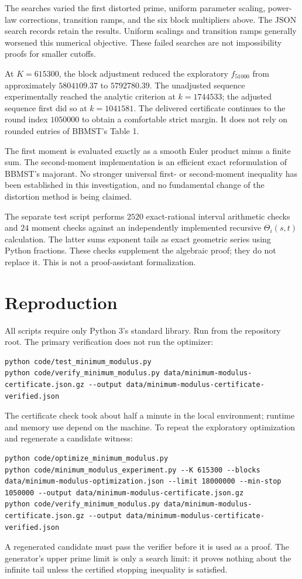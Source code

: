 \documentclass[11pt]{article}
\begin{document}
The searches varied the first distorted prime, uniform parameter scaling,
power-law corrections, transition ramps, and the six block multipliers above.
The JSON search records retain the results. Uniform scalings and transition
ramps generally worsened this numerical objective. These failed searches are
not impossibility proofs for smaller cutoffs.

At $K=615300$, the block adjustment reduced the exploratory $f_{51000}$
from approximately $5804109.37$ to $5792780.39$. The unadjusted sequence
experimentally reached the analytic criterion at $k=1744533$; the adjusted
sequence first did so at $k=1041581$. The delivered certificate continues to
the round index $1050000$ to obtain a comfortable strict margin. It does not
rely on rounded entries of BBMST's Table 1.

The first moment is evaluated exactly as a smooth Euler product minus a finite
sum. The second-moment implementation is an efficient exact reformulation
of BBMST's majorant. No stronger universal first- or second-moment inequality
has been established in this investigation, and no fundamental change of the
distortion method is being claimed.

The separate test script performs $2520$ exact-rational interval arithmetic
checks and $24$ moment checks against an independently implemented recursive
$\Theta_i(s,t)$ calculation. The latter sums exponent tails as exact geometric
series using Python fractions. These checks supplement the algebraic proof;
they do not replace it. This is not a proof-assistant formalization.

\section{Reproduction}
All scripts require only Python 3's standard library. Run from the repository
root. The primary verification does not run the optimizer:
\begin{lstlisting}[basicstyle=\ttfamily\small,breaklines=true]
python code/test_minimum_modulus.py
python code/verify_minimum_modulus.py data/minimum-modulus-certificate.json.gz --output data/minimum-modulus-certificate-verified.json
\end{lstlisting}
The certificate check took about half a minute in the local environment;
runtime and memory use depend on the machine. To repeat the exploratory
optimization and regenerate a candidate witness:
\begin{lstlisting}[basicstyle=\ttfamily\small,breaklines=true]
python code/optimize_minimum_modulus.py
python code/minimum_modulus_experiment.py --K 615300 --blocks data/minimum-modulus-optimization.json --limit 18000000 --min-stop 1050000 --output data/minimum-modulus-certificate.json.gz
python code/verify_minimum_modulus.py data/minimum-modulus-certificate.json.gz --output data/minimum-modulus-certificate-verified.json
\end{lstlisting}
A regenerated candidate must pass the verifier before it is used as a proof.
The generator's upper prime limit is only a search limit: it proves nothing
about the infinite tail unless the certified stopping inequality is satisfied.
\end{document}
